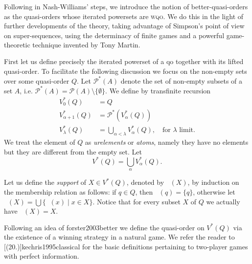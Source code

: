 \documentclass{article}%
\newcommand\textcite{}
\theoremstyle{plain}
\theoremstyle{definition}
\theoremstyle{remark}
\newcommand{\wqo}{\textsc{wqo}}
\newcommand{\PowerQ}{V^{*}}
\DeclareMathOperator{\supp}{supp_{Q}}
\DeclareMathOperator{\trc}{tc_{Q}}
\begin{document}
\medskip
Following in Nash-Williams' steps, we introduce the notion of better-quasi-orders as the quasi-orders whose iterated powersets are \wqo{}. We do this in the light of further developments of the theory, taking advantage of Simpson's point of view on super-sequences, using the determinacy of finite games and a powerful game-theoretic technique invented by Tony Martin.     

First let us define precisely the iterated powerset of a qo together with its lifted quasi-order. To facilitate the following discussion we focus on the non-empty sets over some quasi-order $Q$.  Let $\mathcal{P}^{*}(A)$ denote the set of non-empty subsets of a set $A$, i.e. $\mathcal{P}^{*}(A)=\mathcal{P}(A)\setminus \{\emptyset\}$. We define by transfinite recursion 
\begin{align*}
\PowerQ_{0}(Q)&=Q\\
\PowerQ_{\alpha+1}(Q)&=\mathcal{P}^{*}(\PowerQ_{\alpha}(Q))\\
\PowerQ_{\lambda}(Q)&=\bigcup_{\alpha<\lambda}\PowerQ_{\alpha}(Q), \quad \text{for $\lambda$ limit.}
\end{align*}
We treat the element of $Q$ as \emph{urelements} or \emph{atoms}, namely they have no elements but they are different from the empty set. 
Let
\[
\PowerQ(Q)=\bigcup_{\alpha} \PowerQ_{\alpha}(Q).
\]

Let us define the \emph{support} of $X\in\PowerQ(Q)$, denoted by $\supp(X)$, by induction on the membership relation as follows: if $q\in Q$, then $\supp(q)=\{q\}$, otherwise let $\supp(X)=\bigcup \{ \supp(x)\mid x\in X\}$. Notice that for every subset $X$ of $Q$ we actually have $\supp(X)=X$.


Following an idea of \textcite{forster2003better} we define the quasi-order on $\PowerQ(Q)$ via the existence of a winning strategy in a natural game. We refer the reader to \textcite[(20.)]{kechris1995classical} for the basic definitions pertaining to two-player games with perfect information.
\end{document}
